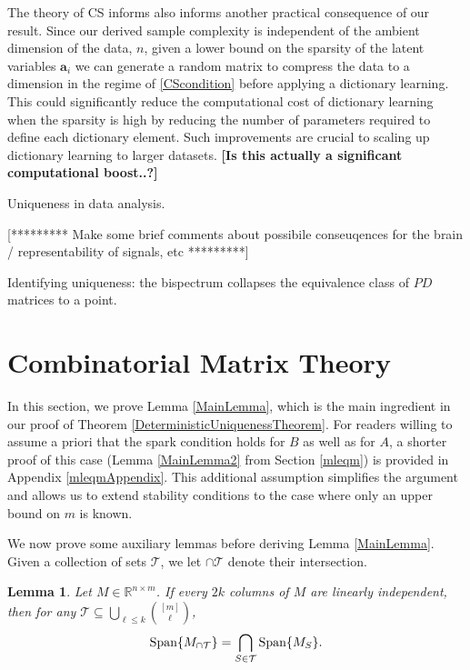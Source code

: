 \documentclass[journal, onecolumn]{IEEEtran}
\newtheorem{lemma}{Lemma}
\begin{document}
The theory of CS informs also informs another practical consequence of our result. Since our derived sample complexity is independent of the ambient dimension of the data, $n$, given a lower bound on the sparsity of the latent variables $\mathbf{a}_i$ we can generate a random matrix to compress the data to a dimension in the regime of \eqref{CScondition} before applying a dictionary learning. This could significantly reduce the computational cost of dictionary learning when the sparsity is high by reducing the number of parameters required to define each dictionary element. Such improvements are crucial to scaling up dictionary learning to larger datasets. \textbf{[Is this actually a significant computational boost..?]}

Uniqueness in data analysis.

[********* Make some brief comments about possibile conseuqences for the brain / representability of signals, etc *********]


Identifying uniqueness: the bispectrum collapses the equivalence class of $PD$ matrices to a point.


\appendices
\section{Combinatorial Matrix Theory}\label{appendixA}

In this section, we prove Lemma \ref{MainLemma}, which is the main ingredient in our proof of Theorem \ref{DeterministicUniquenessTheorem}. For readers willing to assume a priori that the spark condition holds for $B$ as well as for $A$, a shorter proof of this case (Lemma \ref{MainLemma2} from Section \ref{mleqm}) is provided in Appendix \ref{mleqmAppendix}. This additional assumption simplifies the argument and allows us to extend stability conditions to the case where only an upper bound on $m$ is known. 

We now prove some auxiliary lemmas before deriving Lemma \ref{MainLemma}.  Given a collection of sets $\mathcal{T}$, we let $\cap \mathcal{T}$ denote their intersection.


\begin{lemma}\label{SpanIntersectionLemma}
Let $M \in \mathbb{R}^{n \times m}$. If every $2k$ columns of $M$ are linearly independent, then for any $\mathcal{T} \subseteq \bigcup_{\ell \leq k} {[m] \choose \ell}$,
\begin{align}
\text{\rm Span}\{M_{\cap \mathcal{T}}\}  = \bigcap_{S \in \mathcal{T}} \text{\rm Span}\{M_S\}.
\end{align}
\end{lemma}
\end{document}
